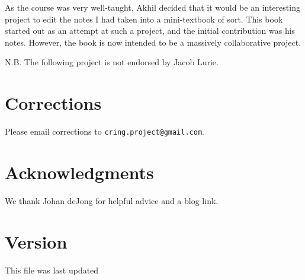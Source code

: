 As the course was very well-taught, Akhil decided that it would be an interesting project to 
edit the notes I had taken into a mini-textbook of sort. This book started out as an
attempt 
at such a project, and the initial contribution was his notes. However, the
book is now intended to be a massively collaborative
project.

N.B. The following project is not endorsed by Jacob Lurie.


\section*{Corrections}
Please email corrections to
\verb=cring.project@gmail.com=.

\section*{Acknowledgments}

We thank Johan deJong for helpful advice and a blog link.


\section*{Version}
This file was last updated 


